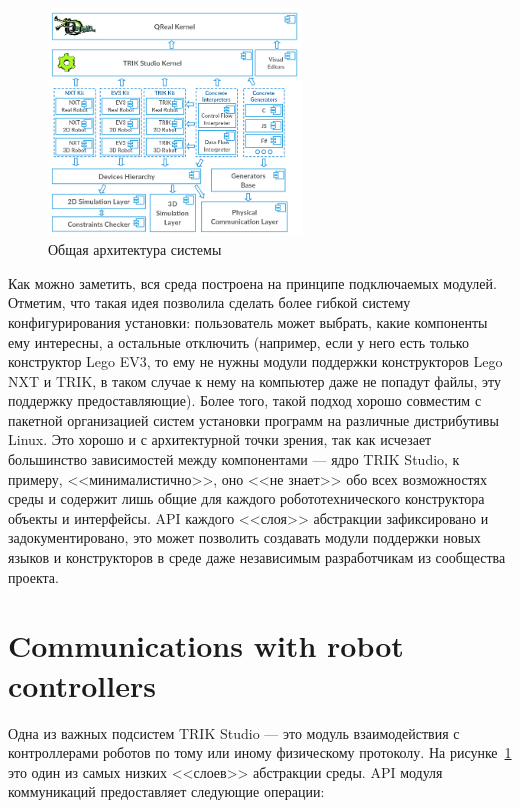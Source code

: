\documentclass[conference]{IEEEtran}
\begin{document}
\begin{figure}[ht]
    \centering
    \includegraphics[width=0.6\textwidth]{TS_Common_Architecture.png}
    \caption{Общая архитектура системы}
    \label{image:commonTSArch}
\end{figure}

Как можно заметить, вся среда построена на принципе подключаемых модулей. Отметим, что такая идея позволила сделать более гибкой систему конфигурирования установки: пользователь может выбрать, какие компоненты ему интересны, а остальные отключить (например, если у него есть только конструктор Lego EV3, то ему не нужны модули поддержки конструкторов Lego NXT и TRIK, в таком случае к нему на компьютер даже не попадут файлы, эту поддержку предоставляющие). Более того, такой подход хорошо совместим с пакетной организацией систем установки программ на различные дистрибутивы Linux. Это хорошо и с архитектурной точки зрения, так как исчезает большинство зависимостей между компонентами --- ядро TRIK Studio, к примеру, <<минималистично>>, оно <<не знает>> обо всех возможностях среды и содержит лишь общие для каждого робототехнического конструктора объекты и интерфейсы. API каждого <<слоя>> абстракции  зафиксировано и задокументировано, это может позволить создавать модули поддержки новых языков и конструкторов в среде даже независимым разработчикам из сообщества проекта.

\section{Communications with robot controllers}
\label{chapter:communications}

Одна из важных подсистем TRIK Studio --- это модуль взаимодействия с контроллерами роботов по тому или иному физическому протоколу. На рисунке~\ref{image:commonTSArch} это один из самых низких <<слоев>> абстракции среды. API модуля коммуникаций предоставляет следующие операции:
\end{document}
